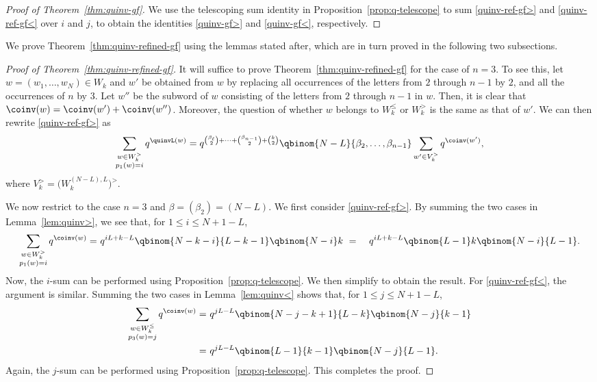 \begin{proof}[Proof of Theorem~\ref{thm:quinv-gf}]
We use the telescoping sum identity in Proposition~\ref{prop:q-telescope} to sum \eqref{quinv-ref-gf>} and \eqref{quinv-ref-gf<} over $i$ and $j$, to obtain the identities \eqref{quinv-gf>} and \eqref{quinv-gf<}, respectively.
\end{proof} 
We prove Theorem~\ref{thm:quinv-refined-gf} using the lemmas stated after, which are in turn
proved in the following two subsections. 
\begin{proof}[Proof of Theorem~\ref{thm:quinv-refined-gf}]
It will suffice to prove Theorem~\ref{thm:quinv-refined-gf} for the case of $n=3$. 
To see this, let $w = (w_1, \dots, w_N) \in W_k$ and $w'$ be obtained from $w$ by replacing all
occurrences of the letters from $2$ through $n-1$ by $2$, and all the occurrences of $n$ by $3$.
Let $w''$ be the subword of $w$ consisting of the letters from $2$ through $n-1$ in $w$. 
Then, it is clear that $\coinv(w) = \coinv(w') + \coinv(w'')$.  Moreover, the question of whether $w$
belongs to $W_k^\leq$ or $W_k^>$ is the same as that of $w'$. 
We can then rewrite \eqref{quinv-ref-gf>} as
\[
\sum_{\substack{ w \in W_k^> \\ p_1(w) = i}} q^{\quinvL(w)} =
q^{\binom{\beta_\ell}{2} + \cdots + \binom{\beta_{n-1}}{2} + \binom{k}{2}} 
\qbinom{N-L}{\beta_2,\dots,\beta_{n-1}}
\sum_{w'\in V_k^{>}} q^{\coinv(w')},
\]
where $V_k^> = \big(W^{(N-L),L}_k \big)^>$.


We now restrict to the case $n=3$ and $\beta = (\beta_2) = (N-L)$. 
We first consider \eqref{quinv-ref-gf>}.
By summing the two cases in Lemma~\ref{lem:quinv>}, we see that, for $1 \leq i \leq N +1 - L$,
\begin{align*}
\sum_{\substack{ w \in W_k^> \\ p_1(w) = i}} q^{\coinv(w)} 
=&\ q^{ iL + k - L} \qbinom{N-k-i}{L-k-1} \qbinom {N-i}k \
=&\ q^{ iL + k - L}  \qbinom{L-1}k \qbinom{N-i}{L-1}.
\end{align*}
Now, the $i$-sum can be performed using Proposition~\ref{prop:q-telescope}. We then simplify to obtain the result.
For \eqref{quinv-ref-gf<}, the argument is similar. Summing the two cases in Lemma~\ref{lem:quinv<}
shows that, for $1 \leq j \leq N +1 - L$,
\begin{align*}
\sum_{\substack{ w \in W_k^\leq \\ p_3(w) = j}} q^{\coinv(w)} 
=&\ q^{ j L - L} \qbinom{N-j-k+1}{L-k} \qbinom {N-j}{k-1} \\
=&\ q^{ j L - L} \qbinom{L-1}{k-1} \qbinom{N-j}{L-1}.
\end{align*}
Again, the $j$-sum can be performed using Proposition~\ref{prop:q-telescope}. This completes the proof.
\end{proof}

